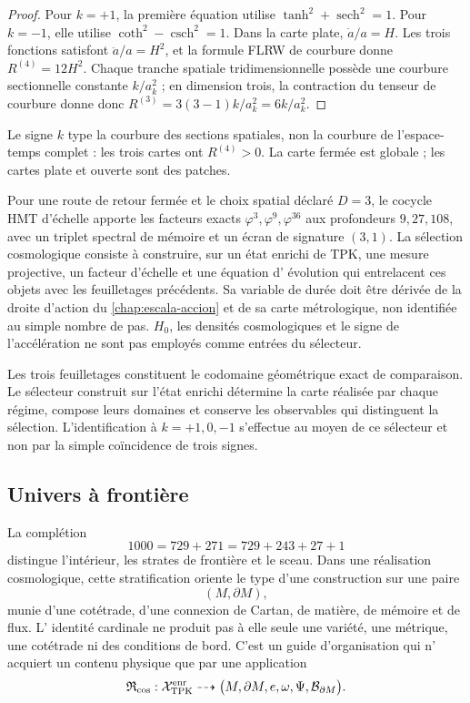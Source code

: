 \begin{proof}
Pour \(k=+1\), la première équation utilise
\(\tanh^2+\operatorname{sech}^2=1\). Pour \(k=-1\), elle utilise
\(\coth^2-\operatorname{csch}^2=1\). Dans la carte plate,
\(\dot a/a=H\). Les trois fonctions satisfont
\(\ddot a/a=H^2\), et la formule FLRW de courbure donne
\(R^{(4)}=12H^2\). Chaque tranche spatiale tridimensionnelle possède une courbure
sectionnelle constante \(k/a_k^2\) ; en dimension trois, la contraction du tenseur
de courbure donne donc
\(R^{(3)}=3(3-1)k/a_k^2=6k/a_k^2\).
\end{proof}

Le signe \(k\) type la courbure des sections spatiales, non la
courbure de l'espace-temps complet : les trois cartes ont
\(R^{(4)}>0\). La carte fermée est globale ; les cartes plate et ouverte sont
des patches.

\begin{statusbox}
    Pour une route de retour fermée et le choix spatial déclaré
    \(D=3\), le cocycle HMT d'échelle apporte les facteurs exacts
    \(\varphi^3,\varphi^9,\varphi^{36}\) aux profondeurs
    \(9,27,108\), avec un triplet spectral de mémoire et un écran de
    signature \((3,1)\). La sélection cosmologique consiste à construire, sur
    un état enrichi de TPK, une mesure projective, un facteur d'échelle et une équation d'
    évolution qui entrelacent ces objets avec les feuilletages précédents. Sa
    variable de durée doit être dérivée de la droite d'action du
    \cref{chap:escala-accion} et de sa carte métrologique, non identifiée
    au simple nombre de pas. \(H_0\), les densités cosmologiques et le signe
    de l'accélération ne sont pas employés comme entrées du sélecteur.
\end{statusbox}

Les trois feuilletages constituent le codomaine géométrique exact de
comparaison. Le sélecteur construit sur l'état enrichi détermine la
carte réalisée par chaque régime, compose leurs domaines et conserve les
observables qui distinguent la sélection. L'identification à
\(k=+1,0,-1\) s'effectue au moyen de ce sélecteur et non par la simple coïncidence
de trois signes.

\subsection{Univers à frontière}
\label{sec:universo-con-frontera-hmt}

La complétion
\[
 1000=729+271=729+243+27+1
\]
distingue l'intérieur, les strates de frontière et le sceau. Dans une réalisation
cosmologique, cette stratification oriente le type d'une construction sur
une paire
\[
 (M,\partial M),
\]
munie d'une cotétrade, d'une connexion de Cartan, de matière, de mémoire et de flux. L'
identité cardinale ne produit pas à elle seule une variété, une métrique, une
cotétrade ni des conditions de bord. C'est un guide d'organisation qui n'
acquiert un contenu physique que par une application
\[
 \mathfrak R_{\rm cos}:
 \mathcal X_{\rm TPK}^{\rm enr}
 \dashrightarrow
 \bigl(M,\partial M,e,\omega,\Psi,\mathcal B_{\partial M}\bigr).
\]

